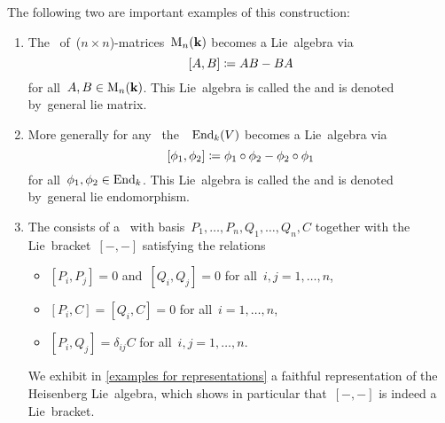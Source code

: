 \begin{examples}
\begin{enumerate}
      The following two are important examples of this construction:
      \begin{enumerate}
        \item
          The~{\algebra{$\kf$}} of~($n \times n$)-matrices~$\operatorname{M}_n(\mathbf{k})$ becomes a Lie~algebra via
          \[
            [A,B]
            \coloneqq
            AB - BA
          \]
          for all~$A, B \in \operatorname{M}_n(\mathbf{k})$.
          This Lie~algebra is called the  and is denoted by~\gls*{general lie matrix}.
        \item
          More generally for any~{\vectorspace{$\kf$}} the~{\algebra{$\kf$}}~$\operatorname{End}_k(V)$ becomes a Lie~algebra via
          \[
            [\phi_1, \phi_2]
            \coloneqq
            \phi_1 \circ \phi_2 - \phi_2 \circ \phi_1
          \]
          for all~$\phi_1, \phi_2 \in \operatorname{End}_k$.
          This Lie~algebra is called the  and is denoted by~\gls*{general lie endomorphism}.
      \item
        The  consists of a~{\vectorspace{$\kf$}} with basis~$P_1, \dotsc, P_n, Q_1, \dotsc, Q_n, C$ together with the Lie~bracket~$[-,-]$ satisfying the relations
        \begin{itemize}
          \item
            $[P_i, P_j] = 0$ and~$[Q_i, Q_j] = 0$ for all~$i, j = 1, \dotsc, n$,
          \item
            $[P_i, C] = [Q_i, C] = 0$ for all~$i = 1, \dotsc, n$,
          \item
            $[P_i, Q_j] = \delta_{ij} C$ for all~$i,j = 1, \dotsc, n$.
        \end{itemize}
        We exhibit in \cref{examples for representations} a faithful representation of the Heisenberg Lie~algebra, which shows in particular that~$[-,-]$ is indeed a Lie~bracket.
    \end{enumerate}
  \end{enumerate}
\end{examples}


